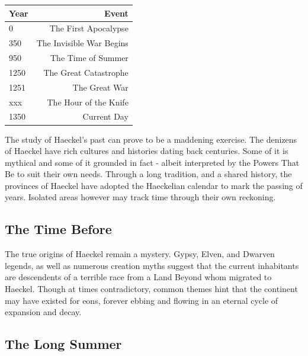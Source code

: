 \begin{multicols}{2}
\begin{tabular}{l|r}
    \hline
    Year & Event \\
    \hline
    0    & The First Apocalypse \\
    350 & The Invisible War Begins \\
    950 & The Time of Summer \\
    1250 & The Great Catastrophe \\
    1251 & The Great War \\
    xxx & The Hour of the Knife \\
    1350 & Current Day \\
\end{tabular}


The study of Haeckel's past can prove to be a maddening exercise. The denizens of Haeckel have rich cultures and histories dating back centuries. Some of it is mythical and some of it grounded in fact - albeit interpreted by the Powers That Be to suit their own needs. Through a long tradition, and a shared history, the provinces of Haeckel have adopted the Haeckelian calendar to mark the passing of years. Isolated areas however may track time through their own reckoning. 

\subsection{The Time Before}

The true origins of Haeckel remain a mystery. Gypsy,  Elven, and Dwarven legends, as well as numerous creation myths suggest that the current inhabitants are descendents of a terrible race from a Land Beyond whom migrated to Haeckel. Though at times contradictory, common themes hint that the continent may have existed for eons, forever ebbing and flowing in an eternal cycle of expansion and decay. 

\subsection{The Long Summer} 


\end{multicols}
